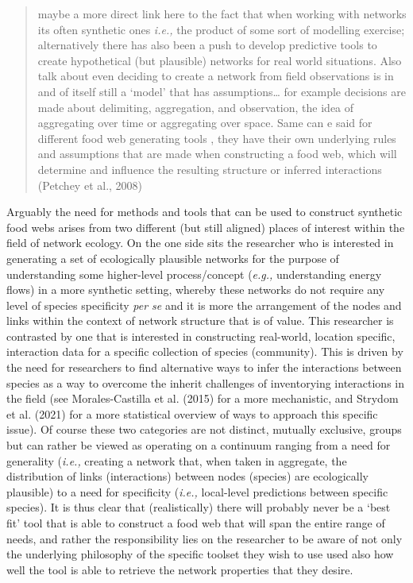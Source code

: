 \documentclass[
]{article}
\begin{document}
\begin{quote}
maybe a more direct link here to the fact that when working with
networks its often synthetic ones \emph{i.e.,} the product of some sort
of modelling exercise; alternatively there has also been a push to
develop predictive tools to create hypothetical (but plausible) networks
for real world situations. Also talk about even deciding to create a
network from field observations is in and of itself still a `model' that
has assumptions\ldots{} for example decisions are made about delimiting,
aggregation, and observation, the idea of aggregating over time or
aggregating over space. Same can e said for different food web
generating tools , they have their own underlying rules and assumptions
that are made when constructing a food web, which will determine and
influence the resulting structure or inferred interactions (Petchey et
al., 2008)
\end{quote}

Arguably the need for methods and tools that can be used to construct
synthetic food webs arises from two different (but still aligned) places
of interest within the field of network ecology. On the one side sits
the researcher who is interested in generating a set of ecologically
plausible networks for the purpose of understanding some higher-level
process/concept (\emph{e.g.,} understanding energy flows) in a more
synthetic setting, whereby these networks do not require any level of
species specificity \emph{per se} and it is more the arrangement of the
nodes and links within the context of network structure that is of
value. This researcher is contrasted by one that is interested in
constructing real-world, location specific, interaction data for a
specific collection of species (community). This is driven by the need
for researchers to find alternative ways to infer the interactions
between species as a way to overcome the inherit challenges of
inventorying interactions in the field (see Morales-Castilla et al.
(2015) for a more mechanistic, and Strydom et al. (2021) for a more
statistical overview of ways to approach this specific issue). Of course
these two categories are not distinct, mutually exclusive, groups but
can rather be viewed as operating on a continuum ranging from a need for
generality (\emph{i.e.,} creating a network that, when taken in
aggregate, the distribution of links (interactions) between nodes
(species) are ecologically plausible) to a need for specificity
(\emph{i.e.,} local-level predictions between specific species). It is
thus clear that (realistically) there will probably never be a `best
fit' tool that is able to construct a food web that will span the entire
range of needs, and rather the responsibility lies on the researcher to
be aware of not only the underlying philosophy of the specific toolset
they wish to use used also how well the tool is able to retrieve the
network properties that they desire.
\end{document}
